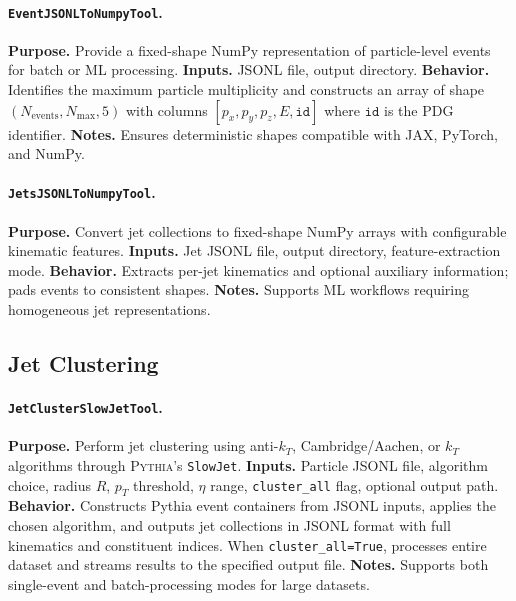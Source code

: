 \documentclass[11pt,oneside]{article}
\numberwithin{equation}{section}
\begin{document}
\begin{appendix}
\paragraph{\texttt{EventJSONLToNumpyTool}.}
\textbf{Purpose.} Provide a fixed-shape NumPy representation of particle-level events for batch or ML processing.
\textbf{Inputs.} JSONL file, output directory.
\textbf{Behavior.} Identifies the maximum particle multiplicity and constructs an array of shape $(N_{\mathrm{events}}, N_{\mathrm{max}}, 5)$ with columns $[p_x,p_y,p_z,E,\texttt{id}]$ where $\texttt{id}$ is the PDG identifier.
\textbf{Notes.} Ensures deterministic shapes compatible with JAX, PyTorch, and NumPy.

\paragraph{\texttt{JetsJSONLToNumpyTool}.}
\textbf{Purpose.} Convert jet collections to fixed-shape NumPy arrays with configurable kinematic features.  
\textbf{Inputs.} Jet JSONL file, output directory, feature-extraction mode.  
\textbf{Behavior.} Extracts per-jet kinematics and optional auxiliary information; pads events to consistent shapes.  
\textbf{Notes.} Supports ML workflows requiring homogeneous jet representations.


\subsection{Jet Clustering}

\paragraph{\texttt{JetClusterSlowJetTool}.}
\textbf{Purpose.} Perform jet clustering using anti-$k_T$, Cambridge/Aachen, or $k_T$ algorithms through \textsc{Pythia}'s \texttt{SlowJet}.
\textbf{Inputs.} Particle JSONL file, algorithm choice, radius $R$, $p_T$ threshold, $\eta$ range, \texttt{cluster\_all} flag, optional output path.
\textbf{Behavior.} Constructs Pythia event containers from JSONL inputs, applies the chosen algorithm, and outputs jet collections in JSONL format with full kinematics and constituent indices. When \texttt{cluster\_all=True}, processes entire dataset and streams results to the specified output file.
\textbf{Notes.} Supports both single-event and batch-processing modes for large datasets.


\end{appendix}
\end{document}
